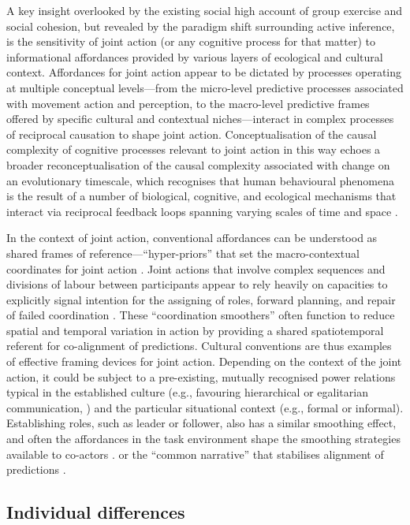 \begin{CJK}{UTF8}{gbsn}
    A key insight overlooked by the existing social high account of group exercise and social cohesion, but revealed by the paradigm shift surrounding active inference, is the sensitivity of joint action (or any cognitive process for that matter) to informational affordances provided by various layers of ecological and cultural context.  Affordances for joint action appear to be dictated by processes operating at multiple conceptual levels---from the micro-level predictive processes associated with movement action and perception, to the macro-level predictive frames offered by specific cultural and contextual niches---interact in complex processes of reciprocal causation to shape joint action.  Conceptualisation of the causal complexity of cognitive processes relevant to joint action in this way echoes a broader reconceptualisation of the causal complexity associated with change on an evolutionary timescale, which recognises that human behavioural phenomena is the result of a number of biological, cognitive, and ecological mechanisms that interact via reciprocal feedback loops spanning varying scales of time and space \citep{Fuentes2015}.

    In the context of joint action, conventional affordances can be understood as shared frames of reference---``hyper-priors'' that set the macro-contextual coordinates for joint action \citep{Clark2013}. Joint actions that involve complex sequences and divisions of labour between participants appear to rely heavily on capacities to explicitly signal intention for the assigning of roles, forward planning, and repair of failed coordination \citep{Frith2010}.  These ``coordination smoothers'' \citep{Vesper2017} often function to reduce spatial and temporal variation in action by providing a shared spatiotemporal referent for co-alignment of predictions.  Cultural conventions are thus examples of effective framing devices for joint action.  Depending on the context of the joint action, it could be subject to a pre-existing, mutually recognised power relations typical in the established culture (e.g., favouring hierarchical or egalitarian communication, \citep[see]{Cheon2011}) and the particular situational context (e.g., formal or informal).  Establishing roles, such as leader or follower, also has a similar smoothing effect, and often the affordances in the task environment shape the smoothing strategies available to co-actors \citep{Marsh2009}.
    or the ``common narrative'' that stabilises alignment of predictions \citep{Friston2015}.


    \subsection{Individual differences\label{sect:individualDifferences}}


\end{CJK}
